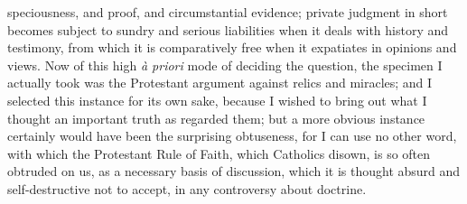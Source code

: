 speciousness, and proof, and circumstantial evidence;
private judgment in short becomes subject to sundry and
serious liabilities when it deals with history and
testimony, from which it is comparatively free when it
expatiates in opinions and views. Now of this high \emph{à
priori} mode of deciding the question, the specimen I
actually took was the Protestant argument against relics
and miracles; and I selected this instance for its own
sake, because I wished to bring out what I thought an
important truth as regarded them; but a more obvious
instance certainly would have been the surprising
obtuseness, for I can use no other word, with which the
Protestant Rule of Faith, which Catholics disown, is so
often obtruded on us, as a necessary basis of discussion,
which it is thought absurd and self-destructive not to
accept, in any controversy about doctrine.

